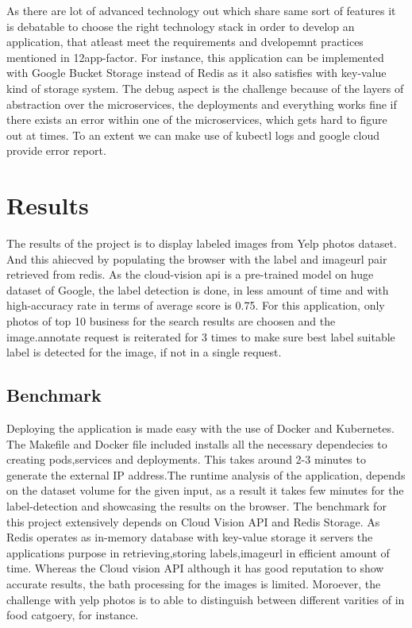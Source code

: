 As there are lot of advanced technology out which share same sort of
features it is debatable to choose the right technology stack in order
to develop an application, that atleast meet the requirements and
dvelopemnt practices mentioned in 12app-factor. For instance, this
application can be implemented with Google Bucket Storage instead of
Redis as it also satisfies with key-value kind of storage system.  The
debug aspect is the challenge because of the layers of abstraction
over the microservices, the deployments and everything works fine if
there exists an error within one of the microservices, which gets hard
to figure out at times. To an extent we can make use of kubectl logs
and google cloud provide error report.
  
\section{Results}

The results of the project is to display labeled images from Yelp
photos dataset. And this ahiecved by populating the browser with the
label and imageurl pair retrieved from redis. As the cloud-vision api
is a pre-trained model on huge dataset of Google, the label detection
is done, in less amount of time and with high-accuracy rate in terms
of average score is 0.75. For this application, only photos of top 10
business for the search results are choosen and the image.annotate
request is reiterated for 3 times to make sure best label suitable
label is detected for the image, if not in a single request.

\subsection{Benchmark}

Deploying the application is made easy with the use of Docker and
Kubernetes.  The Makefile and Docker file included installs all the
necessary dependecies to creating pods,services and deployments. This
takes around 2-3 minutes to generate the external IP address.The
runtime analysis of the application, depends on the dataset volume for
the given input, as a result it takes few minutes for the
label-detection and showcasing the results on the browser. The
benchmark for this project extensively depends on Cloud Vision API and
Redis Storage. As Redis operates as in-memory database with key-value
storage it servers the applications purpose in retrieving,storing
labels,imageurl in efficient amount of time. Whereas the Cloud vision
API although it has good reputation to show accurate results, the bath
processing for the images is limited. Moroever, the challenge with
yelp photos is to able to distinguish between different varities of in
food catgoery, for instance.


